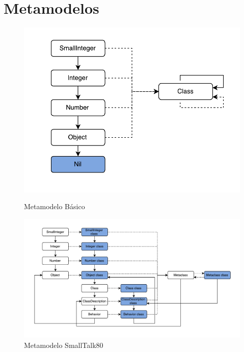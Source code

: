 \documentclass[a4paper, 11pt]{article}
\begin{document}
\thispagestyle{empty}
\tableofcontents

\newpage
\section{Metamodelos}

\begin{figure}[H]
\centering
\begin{minipage}{.4\textwidth}
  \centering
  \includegraphics[width=\linewidth]{images/metamodelo_smalltalk_basico.pdf}
  \caption{Metamodelo B\'asico}
  \label{fig:metamodelo_basico}
\end{minipage}%
\begin{minipage}{.6\textwidth}
  \centering
  \includegraphics[width=1.2\linewidth]{images/metamodelo_smalltalk_80.pdf}
  \caption{Metamodelo SmallTalk80}
  \label{fig:metamodelo_st80}
\end{minipage}
\label{fig:test}
\end{figure}
\end{document}
